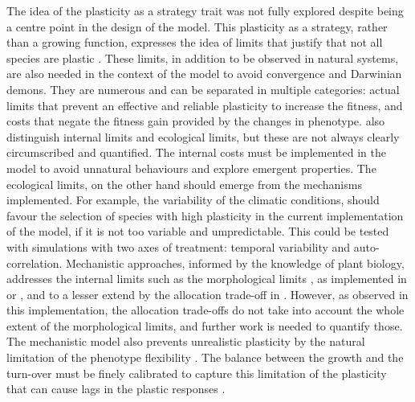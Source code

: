 The idea of the plasticity as a strategy trait \parencite{bradshaw_evolutionary_1965, bradshaw_unravelling_2006} was not fully explored despite being a centre point in the design of the model. This plasticity as a strategy, rather than a growing function, expresses the idea of limits that justify that not all species are plastic \parencite{dewitt_costs_1998,  van_kleunen_constraints_2005, valladares_ecological_2007, auld_re-evaluating_2009}. These limits, in addition to be observed in natural systems, are also needed in the context of the model to avoid convergence and Darwinian demons. They are numerous and can be separated in multiple categories: actual limits that prevent an effective and reliable plasticity to increase the fitness, and costs that negate the fitness gain provided by the changes in phenotype. \cite{valladares_ecological_2007} also distinguish internal limits and ecological limits, but these are not always clearly circumscribed and quantified. The internal costs must be implemented in the model to avoid unnatural behaviours and explore emergent properties. The ecological limits, on the other hand should emerge from the mechanisms implemented. For example, the variability of the climatic conditions, should favour the selection of species with high plasticity in the current implementation of the model, if it is not too variable and umpredictable. This could be tested with simulations with two axes of treatment: temporal variability and auto-correlation. Mechanistic approaches, informed by the knowledge of plant biology, addresses the internal limits such as the morphological limits \parencite{valladares_ecological_2007}, as implemented in \cite{maire_plasticity_2013} or \cite{lohier_analyse_2016}, and to a lesser extend by the allocation trade-off in \model. However, as observed in this implementation, the allocation trade-offs do not take into account the whole extent of the morphological limits, and further work is needed to quantify those. The mechanistic model also prevents unrealistic plasticity by the natural limitation of the phenotype flexibility \parencite{forsman_rethinking_2014}. The balance between the growth and the turn-over must be finely calibrated to capture this limitation of the plasticity that can cause lags in the plastic responses \parencite{dewitt_costs_1998}. %
